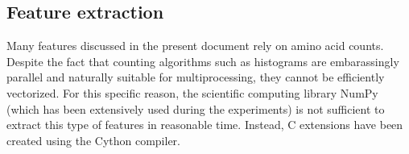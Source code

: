   \subsection{Feature extraction}

    Many features discussed in the present document rely on amino acid counts.
    Despite the fact that counting algorithms such as histograms are embarassingly parallel
    and naturally suitable for multiprocessing, they cannot be efficiently vectorized.
    For this specific reason, the scientific computing library NumPy (which has been extensively
    used during the experiments) is not sufficient to extract this type of features in reasonable
    time. Instead, C extensions have been created using the Cython compiler\cite{behnel2010cython}.

